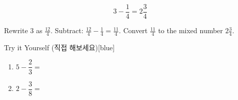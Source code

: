 \documentclass[12pt]{book}
\begin{document}
\[
3 - \dfrac{1}{4} = 2 \dfrac{3}{4}
\]

Rewrite $3$ as $\tfrac{12}{4}$.  
Subtract: $\tfrac{12}{4} - \tfrac{1}{4} = \tfrac{11}{4}$.  
Convert $\tfrac{11}{4}$ to the mixed number $2 \tfrac{3}{4}$.  


\begin{flexbox}{Try it Yourself (직접 해보세요)}[blue]
\begin{enumerate}
  \item $5-\dfrac{2}{3}=$ \vspace*{20pt}
  \item $2-\dfrac{3}{8}=$ \vspace*{20pt}
\end{enumerate}
\end{flexbox}



\end{document}
